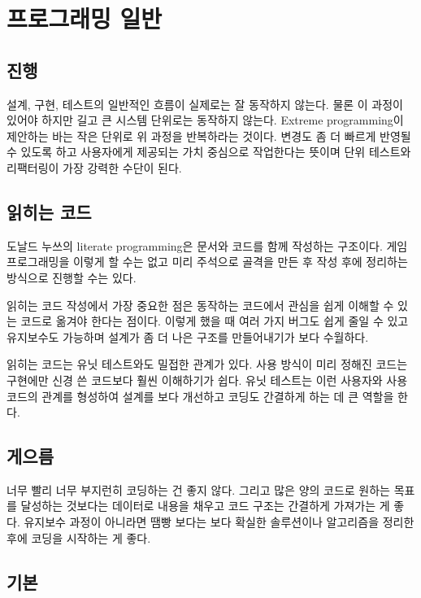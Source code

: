 \documentclass[chapter,kosection, 10.5pt, romanfixed, a4paper]{oblivoir}
\begin{document}
\section{프로그래밍 일반}

\subsection{진행}

설계, 구현, 테스트의 일반적인 흐름이 실제로는 잘 동작하지 않는다. 물론 이 과정이 있어야 하지만
길고 큰 시스템 단위로는 동작하지 않는다. Extreme programming이 제안하는 바는 작은 단위로 
위 과정을 반복하라는 것이다. 변경도 좀 더 빠르게 반영될 수 있도록 하고 사용자에게 제공되는 
가치 중심으로 작업한다는 뜻이며 단위 테스트와 리팩터링이 가장 강력한 수단이 된다. 

\subsection{읽히는 코드}

도날드 누쓰의 literate programming은 문서와 코드를 함께 작성하는 구조이다. 게임 프로그래밍을 
이렇게 할 수는 없고 미리 주석으로 골격을 만든 후 작성 후에 정리하는 방식으로 진행할 수는 있다. 

읽히는 코드 작성에서 가장 중요한 점은 동작하는 코드에서 관심을 쉽게 이해할 수 있는 코드로 
옮겨야 한다는 점이다. 이렇게 했을 때 여러 가지 버그도 쉽게 줄일 수 있고 유지보수도 가능하며 
설계가 좀 더 나은 구조를 만들어내기가 보다 수월하다. 

읽히는 코드는 유닛 테스트와도 밀접한 관계가 있다. 사용 방식이 미리 정해진 코드는 구현에만 
신경 쓴 코드보다 훨씬 이해하기가 쉽다. 유닛 테스트는 이런 사용자와 사용 코드의 관계를 형성하여 
설계를 보다 개선하고 코딩도 간결하게 하는 데 큰 역할을 한다. 

\subsection{게으름}

너무 빨리 너무 부지런히 코딩하는 건 좋지 않다. 그리고 많은 양의 코드로 원하는 목표를 달성하는 것보다는
데이터로 내용을 채우고 코드 구조는 간결하게 가져가는 게 좋다. 유지보수 과정이 아니라면 땜빵 보다는
보다 확실한 솔루션이나 알고리즘을 정리한 후에 코딩을 시작하는 게 좋다. 

\subsection{기본}
\end{document}
